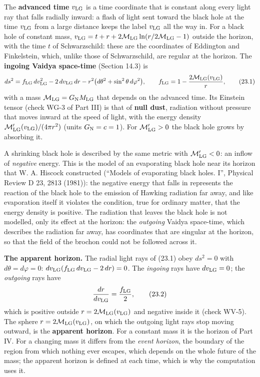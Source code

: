 \documentclass[
  10pt,
]{article}
\begin{document}
The \textbf{advanced time} \(v_{\rm LG}\) is a time coordinate that is
constant along every light ray that falls radially inward: a flash of
light sent toward the black hole at the time \(v_{\rm LG}\) from a large
distance keeps the label \(v_{\rm LG}\) all the way in. For a black hole
of constant mass,
\(v_{\rm LG}=t+r+2\mathcal M_{\rm LG}\ln(r/2\mathcal M_{\rm LG}-1)\)
outside the horizon, with the time \(t\) of Schwarzschild: these are the
coordinates of Eddington and Finkelstein, which, unlike those of
Schwarzschild, are regular at the horizon. The \textbf{ingoing Vaidya
space-time} (Section 14.3) is
\[ds^2=f_{\rm LG}\,dv_{\rm LG}^2-2\,dv_{\rm LG}\,dr-r^2\big(d\theta^2+\sin^2\theta\,d\varphi^2\big),\qquad f_{\rm LG}=1-\frac{2\mathcal M_{\rm LG}(v_{\rm LG})}r,\tag{23.1}\]
with a mass \(\mathcal M_{\rm LG}=G_{\rm N}M_{\rm LG}\) that depends on
the advanced time. Its Einstein tensor (check WG-3 of Part III) is that
of \textbf{null dust}, radiation without pressure that moves inward at
the speed of light, with the energy density
\(\mathcal M_{\rm LG}'(v_{\rm LG})/(4\pi r^2)\) (units
\(G_{\rm N}=c=1\)). For \(\mathcal M_{\rm LG}'>0\) the black hole grows
by absorbing it.

A shrinking black hole is described by the same metric with
\(\mathcal M_{\rm LG}'<0\): an inflow of \emph{negative} energy. This is
the model of an evaporating black hole near its horizon that W. A.
Hiscock constructed (``Models of evaporating black holes. I'', Physical
Review D 23, 2813 (1981)): the negative energy that falls in represents
the reaction of the black hole to the emission of Hawking radiation far
away, and like evaporation itself it violates the condition, true for
ordinary matter, that the energy density is positive. The radiation that
leaves the black hole is not modelled, only its effect at the horizon:
the \emph{outgoing} Vaidya space-time, which describes the radiation far
away, has coordinates that are singular at the horizon, so that the
field of the brochon could not be followed across it.

\textbf{The apparent horizon.} The radial light rays of (23.1) obey
\(ds^2=0\) with \(d\theta=d\varphi=0\):
\(dv_{\rm LG}(f_{\rm LG}\,dv_{\rm LG}-2\,dr)=0\). The \emph{ingoing}
rays have \(dv_{\rm LG}=0\); the \emph{outgoing} rays have
\[\frac{dr}{dv_{\rm LG}}=\frac{f_{\rm LG}}2,\tag{23.2}\] which is
positive outside \(r=2\mathcal M_{\rm LG}(v_{\rm LG})\) and negative
inside it (check WV-5). The sphere
\(r=2\mathcal M_{\rm LG}(v_{\rm LG})\), on which the outgoing light rays
stop moving outward, is the \textbf{apparent horizon}. For a constant
mass it is the horizon of Part IV. For a changing mass it differs from
the \emph{event horizon}, the boundary of the region from which nothing
ever escapes, which depends on the whole future of the mass; the
apparent horizon is defined at each time, which is why the computation
uses it.
\end{document}
